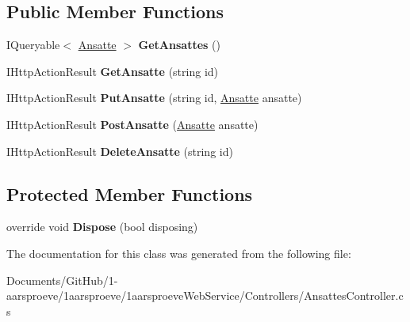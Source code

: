 \subsection*{Public Member Functions}
\begin{DoxyCompactItemize}
\item 
\hypertarget{class__1aarsproeve_web_service_1_1_controllers_1_1_ansattes_controller_a0f9b92dc8cf920494127741daa9f4f28}{}I\+Queryable$<$ \hyperlink{class__1aarsproeve_web_service_1_1_ansatte}{Ansatte} $>$ {\bfseries Get\+Ansattes} ()\label{class__1aarsproeve_web_service_1_1_controllers_1_1_ansattes_controller_a0f9b92dc8cf920494127741daa9f4f28}

\item 
\hypertarget{class__1aarsproeve_web_service_1_1_controllers_1_1_ansattes_controller_abfaf7e07989342482972410cfc37e38d}{}I\+Http\+Action\+Result {\bfseries Get\+Ansatte} (string id)\label{class__1aarsproeve_web_service_1_1_controllers_1_1_ansattes_controller_abfaf7e07989342482972410cfc37e38d}

\item 
\hypertarget{class__1aarsproeve_web_service_1_1_controllers_1_1_ansattes_controller_a038f479063bb013c0b522abe986c0214}{}I\+Http\+Action\+Result {\bfseries Put\+Ansatte} (string id, \hyperlink{class__1aarsproeve_web_service_1_1_ansatte}{Ansatte} ansatte)\label{class__1aarsproeve_web_service_1_1_controllers_1_1_ansattes_controller_a038f479063bb013c0b522abe986c0214}

\item 
\hypertarget{class__1aarsproeve_web_service_1_1_controllers_1_1_ansattes_controller_aef742593e8c9b738f375515b2a8e92c0}{}I\+Http\+Action\+Result {\bfseries Post\+Ansatte} (\hyperlink{class__1aarsproeve_web_service_1_1_ansatte}{Ansatte} ansatte)\label{class__1aarsproeve_web_service_1_1_controllers_1_1_ansattes_controller_aef742593e8c9b738f375515b2a8e92c0}

\item 
\hypertarget{class__1aarsproeve_web_service_1_1_controllers_1_1_ansattes_controller_a590c3bd2e247a51d547e53c47513b286}{}I\+Http\+Action\+Result {\bfseries Delete\+Ansatte} (string id)\label{class__1aarsproeve_web_service_1_1_controllers_1_1_ansattes_controller_a590c3bd2e247a51d547e53c47513b286}

\end{DoxyCompactItemize}
\subsection*{Protected Member Functions}
\begin{DoxyCompactItemize}
\item 
\hypertarget{class__1aarsproeve_web_service_1_1_controllers_1_1_ansattes_controller_ab4d04d1ad66ffdd3ab18b2276842fb2f}{}override void {\bfseries Dispose} (bool disposing)\label{class__1aarsproeve_web_service_1_1_controllers_1_1_ansattes_controller_ab4d04d1ad66ffdd3ab18b2276842fb2f}

\end{DoxyCompactItemize}


The documentation for this class was generated from the following file\+:\begin{DoxyCompactItemize}
\item 
Documents/\+Git\+Hub/1-\/aarsproeve/1aarsproeve/1aarsproeve\+Web\+Service/\+Controllers/Ansattes\+Controller.\+cs\end{DoxyCompactItemize}
